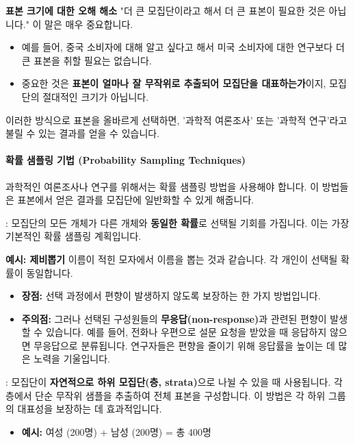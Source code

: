 \documentclass[11pt,a4paper]{article}
\theoremstyle{definition}
\begin{document}
\begin{examplebox}
\textbf{표본 크기에 대한 오해 해소}
"더 큰 모집단이라고 해서 더 큰 표본이 필요한 것은 아닙니다." 이 말은 매우 중요합니다.
\begin{itemize}
    \item 예를 들어, 중국 소비자에 대해 알고 싶다고 해서 미국 소비자에 대한 연구보다 더 큰 표본을 취할 필요는 없습니다.
    \item 중요한 것은 \textbf{표본이 얼마나 잘 무작위로 추출되어 모집단을 대표하는가}이지, 모집단의 절대적인 크기가 아닙니다.
\end{itemize}
이러한 방식으로 표본을 올바르게 선택하면, '과학적 여론조사' 또는 '과학적 연구'라고 불릴 수 있는 결과를 얻을 수 있습니다.
\end{examplebox}

\paragraph{확률 샘플링 기법 (Probability Sampling Techniques)}
과학적인 여론조사나 연구를 위해서는 확률 샘플링 방법을 사용해야 합니다. 이 방법들은 표본에서 얻은 결과를 모집단에 일반화할 수 있게 해줍니다.

\begin{tcolorbox}[infobox, title={확률 샘플링 기법 (1/3): 단순 무작위 샘플링 (Simple Random Sampling)}]
: 모집단의 모든 개체가 다른 개체와 \textbf{동일한 확률}로 선택될 기회를 가집니다. 이는 가장 기본적인 확률 샘플링 계획입니다.
\end{tcolorbox}

\begin{examplebox}
\textbf{예시: 제비뽑기}
이름이 적힌 모자에서 이름을 뽑는 것과 같습니다. 각 개인이 선택될 확률이 동일합니다.
\begin{itemize}
    \item \textbf{장점:} 선택 과정에서 편향이 발생하지 않도록 보장하는 한 가지 방법입니다.
    \item \textbf{주의점:} 그러나 선택된 구성원들의 \textbf{무응답(non-response)}과 관련된 편향이 발생할 수 있습니다. 예를 들어, 전화나 우편으로 설문 요청을 받았을 때 응답하지 않으면 무응답으로 분류됩니다. 연구자들은 편향을 줄이기 위해 응답률을 높이는 데 많은 노력을 기울입니다.
\end{itemize}
\end{examplebox}

\begin{tcolorbox}[infobox, title={확률 샘플링 기법 (2/3): 층화 샘플링 (Stratified Sampling)}]
: 모집단이 \textbf{자연적으로 하위 모집단(층, strata)}으로 나뉠 수 있을 때 사용됩니다. 각 층에서 단순 무작위 샘플을 추출하여 전체 표본을 구성합니다. 이 방법은 각 하위 그룹의 대표성을 보장하는 데 효과적입니다.
\begin{itemize}
    \item \textbf{예시:} 여성 (200명) + 남성 (200명) = 총 400명
\end{itemize}
\end{tcolorbox}
\end{document}
